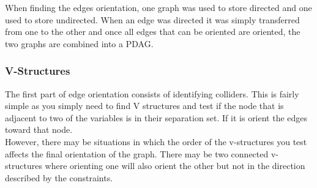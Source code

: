 \documentclass{article}
\begin{document}
When finding the edges orientation, one graph was used to store directed and one used to store undirected. When an edge was directed it was simply transferred from one to the other and once all edges that can be oriented are oriented, the two graphs are combined into a PDAG.\\

\subsubsection{V-Structures}
The first part of edge orientation consists of identifying colliders. This is fairly simple as you simply need to find V structures and test if the node that is adjacent to two of the variables is in their separation set. If it is orient the edges toward that node.\\

However, there may be situations in which the order of the v-structures you test affects the final orientation of the graph. There may be two connected v-structures where orienting one will also orient the other but not in the direction described by the constraints.\\

\begin{center}
\end{center}



\begin{center}
\end{center}
\end{document}

